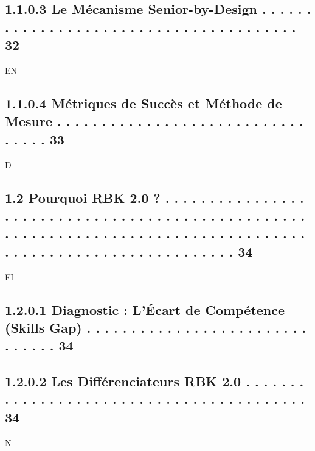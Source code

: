 \documentclass[12pt,landscape,a4paper]{article}
\begin{document}
\subsection{1.1.0.3           Le Mécanisme Senior-by-Design . . . . . . . . . . . . . . . . . . . . . . . . . . . . . . . . . . . . . . .                                                                                                                32}
\vspace{0.5em}
\vspace{0.5em}
\vspace{0.5em}
\vspace{0.5em}
EN\\
\subsection{1.1.0.4           Métriques de Succès et Méthode de Mesure . . . . . . . . . . . . . . . . . . . . . . . . . . . . . . . . .                                                                                                                 33}
\vspace{0.5em}
\vspace{0.5em}
\vspace{0.5em}
\vspace{0.5em}
D\\
\subsection{1.2     Pourquoi RBK 2.0 ? . . . . . . . . . . . . . . . . . . . . . . . . . . . . . . . . . . . . . . . . . . . . . . . . . . . . . . . . . . . . . . . . . . . . . . . . . . . . . . . . . . . . . . . . . . . . . . . . . . . . . . . . . . . . . . 34}
\vspace{0.5em}
\vspace{0.5em}
\vspace{0.5em}
\vspace{0.5em}
FI\\
\subsection{1.2.0.1 Diagnostic : L’Écart de Compétence (Skills Gap) . . . . . . . . . . . . . . . . . . . . . . . . . . . . . . .                                                                                                                        34}
\subsection{1.2.0.2 Les Différenciateurs RBK 2.0 . . . . . . . . . . . . . . . . . . . . . . . . . . . . . . . . . . . . . . . . .                                                                                                                       34}
N\\
\end{document}

